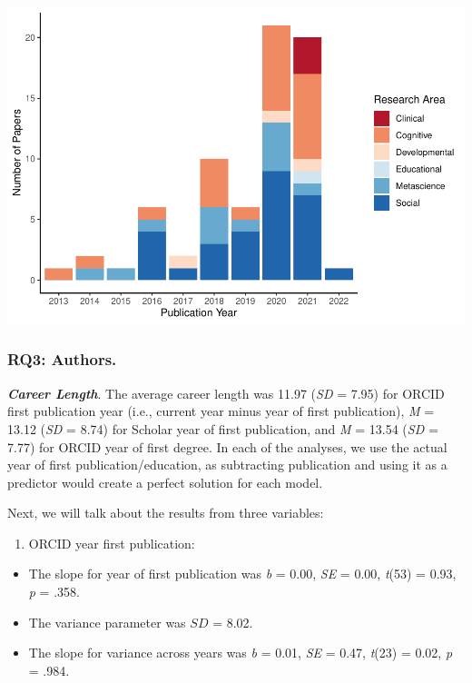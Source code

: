 \documentclass[
  english,
  man]{apa6}
\providecommand{\tightlist}{%
  \setlength{\itemsep}{0pt}\setlength{\parskip}{0pt}}
\begin{document}
\includegraphics{04.manuscript_files/figure-latex/figure1-1.pdf}

\hypertarget{rq3-authors.-1}{%
\subsubsection{\texorpdfstring{RQ3: Authors.\\
}{RQ3: Authors. }}\label{rq3-authors.-1}}

\textbf{\emph{Career Length}}. The average career length was 11.97 (\emph{SD} = 7.95) for ORCID first publication year (i.e., current year minus year of first publication), \emph{M} = 13.12 (\emph{SD} = 8.74) for Scholar year of first publication, and \emph{M} = 13.54 (\emph{SD} = 7.77) for ORCID year of first degree. In each of the analyses, we use the actual year of first publication/education, as subtracting publication and using it as a predictor would create a perfect solution for each model.

Next, we will talk about the results from three variables:

\begin{enumerate}
\def\labelenumi{\arabic{enumi})}
\tightlist
\item
  ORCID year first publication:
\end{enumerate}

\begin{itemize}
\tightlist
\item
  The slope for year of first publication was \emph{b} = 0.00, \emph{SE} = 0.00, \emph{t}(53) = 0.93, \emph{p} = .358.
\item
  The variance parameter was \(SD\) = 8.02.
\item
  The slope for variance across years was \emph{b} = 0.01, \emph{SE} = 0.47, \emph{t}(23) = 0.02, \emph{p} = .984.
\end{itemize}
\end{document}
